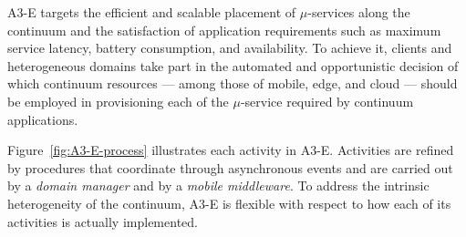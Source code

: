 A3-E targets 
the efficient and scalable placement of $\mu$-services along the continuum and the satisfaction of application requirements such as maximum service latency, battery consumption, and availability. 
To achieve it, clients and heterogeneous domains take part in the automated and opportunistic decision of which continuum resources --- among those of mobile, edge, and cloud --- should be employed in provisioning each of the $\mu$-service required by continuum applications. 




Figure~\ref{fig:A3-E-process} illustrates each activity in A3-E. 
Activities are refined by procedures that coordinate through asynchronous events and are carried out by a \textit{domain manager} and by a \textit{mobile middleware}. 
To address the intrinsic heterogeneity of the continuum, A3-E is flexible with respect to how each of its activities is actually implemented. 




